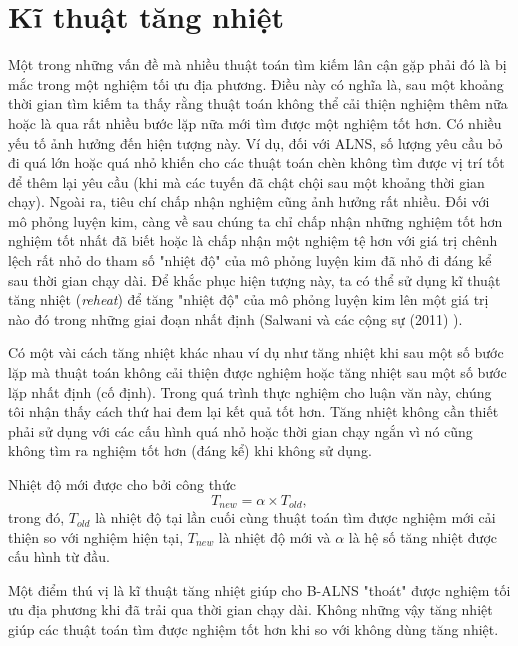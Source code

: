 \section{Kĩ thuật tăng nhiệt}
\label{sec:reheat}
Một trong những vấn đề mà nhiều thuật toán tìm kiếm lân cận gặp phải đó là bị mắc trong một nghiệm tối ưu địa phương. Điều này có nghĩa là, sau một khoảng thời gian tìm kiếm ta thấy rằng thuật toán không thể cải thiện nghiệm thêm nữa hoặc là qua rất nhiều bước lặp nữa mới tìm được một nghiệm tốt hơn. Có nhiều yếu tố ảnh hưởng đến hiện tượng này. Ví dụ, đối với ALNS, số lượng yêu cầu bỏ đi quá lớn hoặc quá nhỏ khiến cho các thuật toán chèn không tìm được vị trí tốt để thêm lại yêu cầu (khi mà các tuyến đã chật chội sau một khoảng thời gian chạy). Ngoài ra, tiêu chí chấp nhận nghiệm cũng ảnh hưởng rất nhiều. Đối với mô phỏng luyện kim, càng về sau chúng ta chỉ chấp nhận những nghiệm tốt hơn nghiệm tốt nhất đã biết hoặc là chấp nhận một nghiệm tệ hơn với giá trị chênh lệch rất nhỏ do tham số "nhiệt độ" của mô phỏng luyện kim đã nhỏ đi đáng kể sau thời gian chạy dài. Để khắc phục hiện tượng này, ta có thể sử dụng kĩ thuật tăng nhiệt (\textit{reheat}) để tăng "nhiệt độ" của mô phỏng luyện kim lên một giá trị nào đó trong những giai đoạn nhất định (Salwani và các cộng sự (2011) \cite{salwani2011re}). 

Có một vài cách tăng nhiệt khác nhau ví dụ như tăng nhiệt khi sau một số bước lặp mà thuật toán không cải thiện được nghiệm hoặc tăng nhiệt sau một số bước lặp nhất định (cố định). Trong quá trình thực nghiệm cho luận văn này, chúng tôi nhận thấy cách thứ hai đem lại kết quả tốt hơn. Tăng nhiệt không cần thiết phải sử dụng với các cấu hình quá nhỏ hoặc thời gian chạy ngắn vì nó cũng không tìm ra nghiệm tốt hơn (đáng kể) khi không sử dụng. 

Nhiệt độ mới được cho bởi công thức
\begin{equation}
  T_{new} = \alpha \times T_{old},
\end{equation}
trong đó, $T_{old}$ là nhiệt độ tại lần cuối cùng thuật toán tìm được nghiệm mới cải thiện so với nghiệm hiện tại, $T_{new}$ là nhiệt độ mới và $\alpha$ là hệ số tăng nhiệt được cấu hình từ đầu.

Một điểm thú vị là kĩ thuật tăng nhiệt giúp cho B-ALNS "thoát" được nghiệm tối ưu địa phương khi đã trải qua thời gian chạy dài. Không những vậy tăng nhiệt giúp các thuật toán tìm được nghiệm tốt hơn khi so với không dùng tăng nhiệt.

